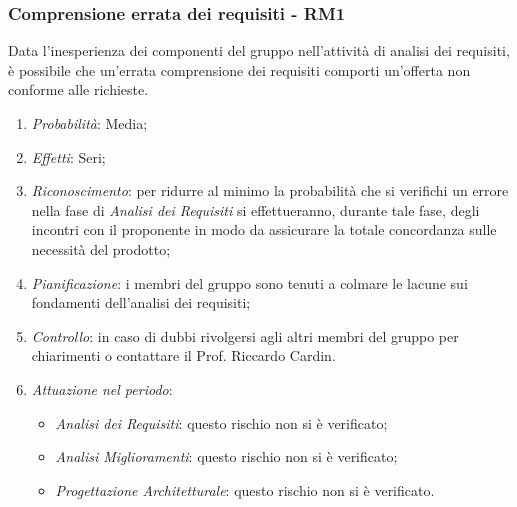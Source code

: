 \subsubsection{Comprensione errata dei requisiti - RM1}
Data l'inesperienza dei componenti del gruppo nell'attivit\`a di analisi dei requisiti, \`e possibile che un'errata comprensione dei requisiti comporti un'offerta non conforme alle richieste.
\begin{enumerate}
\item \textit{Probabilit\`a}: Media;
\item \textit{Effetti}: Seri;
\item \textit{Riconoscimento}: per ridurre al minimo la probabilità che si verifichi un errore nella fase di \textit{Analisi dei Requisiti} si effettueranno, durante tale fase, degli incontri con il proponente in modo da assicurare la totale concordanza sulle necessità del prodotto;
\item \textit{Pianificazione}: i membri del gruppo sono tenuti a colmare le lacune sui fondamenti dell'analisi dei requisiti;
\item \textit{Controllo}: in caso di dubbi rivolgersi agli altri membri del gruppo per chiarimenti o contattare il Prof. Riccardo Cardin.
\item \textit{Attuazione nel periodo}: 
	\begin{itemize}
	\item \textit{Analisi dei Requisiti}: questo rischio non si è verificato;
	\item \textit{Analisi Miglioramenti}: questo rischio non si è verificato;
	\item \textit{Progettazione Architetturale}: questo rischio non si è verificato.
	\end{itemize}
\end{enumerate}

